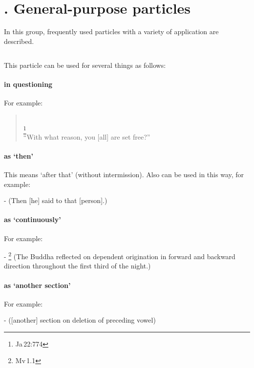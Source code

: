 \label{nipgrp2}
\section*{. General-purpose particles}

In this group, frequently used particles with a variety of application are described.

\subsection*{}\label{nip:atha}
This particle can be used for several things as follows:
\paragraph*{ in questioning} For example:\par
\begin{quote}
\\
\footnote{Ja\,22:774}\\[1.5mm]
``With what reason, you [all] are set free?''
\end{quote}
\paragraph*{ as `then'} This means `after that' (without intermission). Also  can be used in this way, for example:\par
-  (Then [he] said to that [person].) \par
\paragraph*{ as `continuously'} For example:\par
- \footnote{Mv\,1.1} (The Buddha reflected on dependent origination in forward and backward direction throughout the first third of the night.) \par
\paragraph*{ as `another section'} For example:\par
-  ([another] section on deletion of preceding vowel) \par
